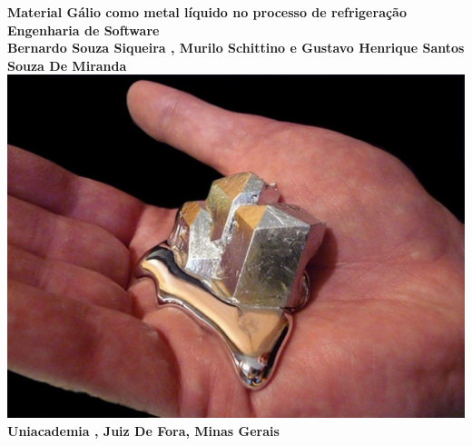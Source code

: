 \documentclass[12pt]{article}
\begin{document}
\begin{center}
    \textbf{Material Gálio como metal líquido no processo de refrigeração}
    \\
    \vspace{0.5cm}
    \textbf{Engenharia de Software}
    \\
    \vspace{0.5cm}
    \textbf{Bernardo Souza Siqueira , Murilo Schittino e Gustavo Henrique Santos Souza De Miranda}
    \\
    \vspace{3cm}
    \includegraphics[width=\textwidth]{gálio.png}
    \\
    \vspace{3cm}
    \textbf{Uniacademia , Juiz De Fora, Minas Gerais}
    
\end{center}
\newpage
\tableofcontents
\newpage
\listoffigures
\newpage
{}
\nocite{*}
\end{document}
